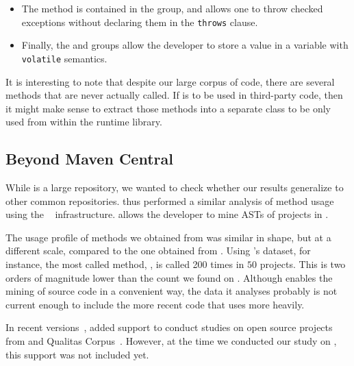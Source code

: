 \begin{itemize}
\item The  method is contained in the  group, and allows one to throw checked exceptions without declaring them in the \texttt{throws} clause.

\item Finally, the  and  groups allow the developer to store a value in a \java{} variable with \texttt{volatile} semantics.

\end{itemize}

It is interesting to note that despite our large corpus of code,
there are several \unsafe{} methods that are never actually called.
If \unsafe{} is to be used in third-party code,
then it might make sense to extract those methods into a separate class to be only used from within the runtime library.

\subsection*{Beyond Maven Central}

While \mavencentral{} is a large repository,
we wanted to check whether our results generalize to other common repositories.
thus performed a similar analysis of method usage using the \boa{}~\cite{dyerBoaLanguageInfrastructure2013,dyerMiningSourceCode2013} infrastructure.
\boa{} allows the developer to mine ASTs of \java{} projects in \sourceforge{}.

The usage profile of \unsafe{} methods we obtained from \boa{} was similar in shape,
but at a different scale, compared to the one obtained from \mavencentral{}.
Using \boa{}'s \sourceforge{} dataset, for instance,
the most called method, , 
is called 200 times in $50$ projects.
This is two orders of magnitude lower than the count we found on \mavencentral{}.
Although \boa{} enables the mining of source code in a convenient way, 
the \code{} data it analyses probably is not current enough to include the more recent \java{} code that uses \smu{} more heavily.

In recent versions~\citep{boa-github},
\boa{} added support to conduct studies on open source projects from \github{} and Qualitas Corpus~\citep{temperoQualitasCorpusCurated2010}.
However, at the time we conducted our study on \unsafe{},
this support was not included yet.
